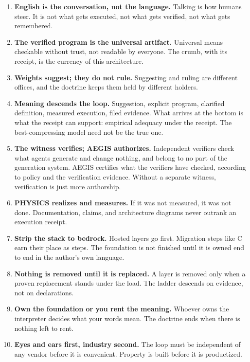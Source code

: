 \documentclass[11pt]{article}
\begin{document}
\begin{enumerate}
\item \textbf{English is the conversation, not the language.}
  Talking is how humans steer. It is not what gets executed, not what
  gets verified, not what gets remembered.

\item \textbf{The verified program is the universal artifact.}
  Universal means checkable without trust, not readable by everyone.
  The crumb, with its receipt, is the currency of this architecture.

\item \textbf{Weights suggest; they do not rule.}
  Suggesting and ruling are different offices, and the doctrine keeps
  them held by different holders.

\item \textbf{Meaning descends the loop.}
  Suggestion, explicit program, clarified definition, measured
  execution, filed evidence. What arrives at the bottom is what the
  receipt can support: empirical adequacy under the receipt. The
  best-compressing model need not be the true one.

\item \textbf{The witness verifies; AEGIS authorizes.}
  Independent verifiers check what agents generate and change nothing,
  and belong to no part of the generation system. AEGIS certifies what
  the verifiers have checked, according to policy and the verification
  evidence. Without a
  separate witness, verification is just more authorship.

\item \textbf{PHYSICS realizes and measures.}
  If it was not measured, it was not done. Documentation, claims,
  and architecture diagrams never outrank an execution receipt.

\item \textbf{Strip the stack to bedrock.}
  Hosted layers go first. Migration steps like C earn their place as
  steps. The foundation is not finished until it is owned end to end
  in the author's own language.

\item \textbf{Nothing is removed until it is replaced.}
  A layer is removed only when a proven replacement stands under the
  load. The ladder descends on evidence, not on declarations.

\item \textbf{Own the foundation or you rent the meaning.}
  Whoever owns the interpreter decides what your words mean. The
  doctrine ends when there is nothing left to rent.

\item \textbf{Eyes and ears first, industry second.}
  The loop must be independent of any vendor before it is convenient.
  Property is built before it is productized.
\end{enumerate}
\end{document}
